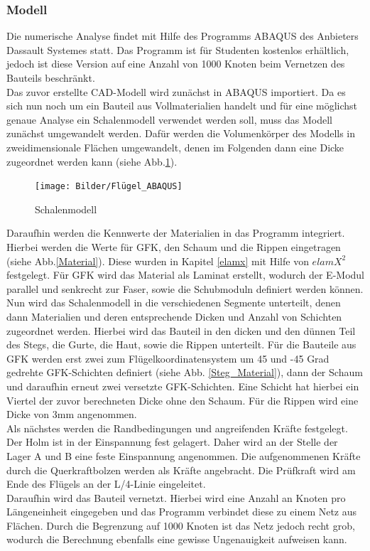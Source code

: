 
\subsubsection{Modell}
Die numerische Analyse findet mit Hilfe des Programms ABAQUS des Anbieters Dassault Systemes statt. Das Programm ist für Studenten kostenlos erhältlich, jedoch ist diese Version auf eine Anzahl von 1000 Knoten beim Vernetzen des Bauteils beschränkt.\\
Das zuvor erstellte CAD-Modell wird zunächst in ABAQUS importiert. Da es sich nun noch um ein Bauteil aus Vollmaterialien handelt und für eine möglichst genaue Analyse ein Schalenmodell verwendet werden soll, muss das Modell zunächst umgewandelt werden. Dafür werden die Volumenkörper des Modells in zweidimensionale Flächen umgewandelt, denen im Folgenden dann eine Dicke zugeordnet werden kann (siehe Abb.\ref{Schalenmodell}).

\begin{figure}[h]
 \centering
 \texttt{[image: Bilder/Flügel\_ABAQUS]}
 \caption{Schalenmodell}
 \label{Schalenmodell}
\end{figure}
\noindent
Daraufhin werden die Kennwerte der Materialien in das Programm integriert. Hierbei werden die Werte für GFK, den Schaum und die Rippen eingetragen (siehe Abb.\ref{Material}). Diese wurden in Kapitel \ref{elamx} mit Hilfe von $elamX^{2}$ festgelegt. Für GFK wird das Material als Laminat erstellt, wodurch der E-Modul parallel und senkrecht zur Faser, sowie die Schubmoduln definiert werden können.\\
\noindent
Nun wird das Schalenmodell in die verschiedenen Segmente unterteilt, denen dann Materialien und deren entsprechende Dicken und Anzahl von Schichten zugeordnet werden. Hierbei wird das Bauteil in den dicken und den dünnen Teil des Stegs, die Gurte, die Haut, sowie die Rippen unterteilt. Für die Bauteile aus GFK werden erst zwei zum Flügelkoordinatensystem um 45 und -45 Grad gedrehte GFK-Schichten definiert (siehe Abb. \ref{Steg_Material}), dann der Schaum und daraufhin erneut zwei versetzte GFK-Schichten. Eine Schicht hat hierbei ein Viertel der zuvor berechneten Dicke ohne den Schaum. Für die Rippen wird eine Dicke von 3mm angenommen.\\
\noindent
Als nächstes werden die Randbedingungen und angreifenden Kräfte festgelegt. Der Holm ist in der Einspannung fest gelagert. Daher wird an der Stelle der Lager A und B eine feste Einspannung angenommen. Die aufgenommenen Kräfte durch die Querkraftbolzen werden als Kräfte angebracht. Die Prüfkraft wird am Ende des Flügels an der L/4-Linie eingeleitet.\\
Daraufhin wird das Bauteil vernetzt. Hierbei wird eine Anzahl an Knoten pro Längeneinheit eingegeben und das Programm verbindet diese zu einem Netz aus Flächen. Durch die Begrenzung auf 1000 Knoten ist das Netz jedoch recht grob, wodurch die Berechnung ebenfalls eine gewisse Ungenauigkeit aufweisen kann. \\
\newpage
